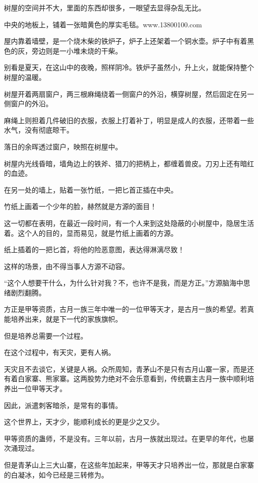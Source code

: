 
\begin{this_body}

树屋的空间并不大，里面的东西却很多，一眼望去显得杂乱无比。

中央的地板上，铺着一张暗黄色的厚实毛毯。www.13800100.com

屋内靠着墙壁，是一个烧木柴的铁炉子，炉子上还架着一个铜水壶。炉子中有着黑色的灰，旁边则是一小堆未烧的干柴。

别看是夏天，在这山中的夜晚，照样阴冷。铁炉子虽然小，升上火，就能保持整个树屋的温暖。

树屋开着两扇窗户，两三根麻绳绕着一侧窗户的外沿，横穿树屋，然后固定在另一侧窗户的外沿。

麻绳上则担着几件破旧的衣服，衣服上打着补丁，明显是成人的衣服，还带着一些水气，没有彻底晾干。

落日的余晖透过窗户，映照在树屋中。

树屋内光线昏暗，墙角边上的铁斧、猎刀的把柄上，都缠着兽皮。刀刃上还有暗红的血迹。

在另一处的墙上，贴着一张竹纸，一把匕首正插在中央。

竹纸上画着一个少年的脸，赫然就是方源的面目！

这一切都在表明，在最近一段时间，有一个人来到这处隐蔽的小树屋中，隐居生活着。这个人的目的，显而易见，就是竹纸上画着的方源。

纸上插着的一把匕首，将他的险恶意图，表达得淋漓尽致！

这样的场景，由不得当事人方源不动容。

“这个人想要干什么，为什么针对我？不，也许不是我，而是方正。”方源脑海中思绪剧烈翻腾。

方正是甲等资质，古月一族三年中唯一的一位甲等天才，是古月一族的希望。若真能培养出来，就是下一代的家族旗帜。

但是培养总需要一个过程。

在这个过程中，有天灾，更有人祸。

天灾且不去谈它，关键是人祸。众所周知，青茅山不是只有古月山寨一家，而是还有着白家寨、熊家寨。这两股势力绝对不会乐意看到，传统霸主古月一族中顺利培养出一位甲等天才。

因此，派遣刺客暗杀，是常有的事情。

这个世界上，天才少，能顺利成长的更是少之又少。

甲等资质的蛊师，不是没有。三年以前，古月一族就出现过。在更早的年代，也屡次涌现过。

但是青茅山上三大山寨，在这些年加起来，甲等天才只培养出一位，那就是白家寨的白凝冰，如今已经是三转修为。


\end{this_body}
